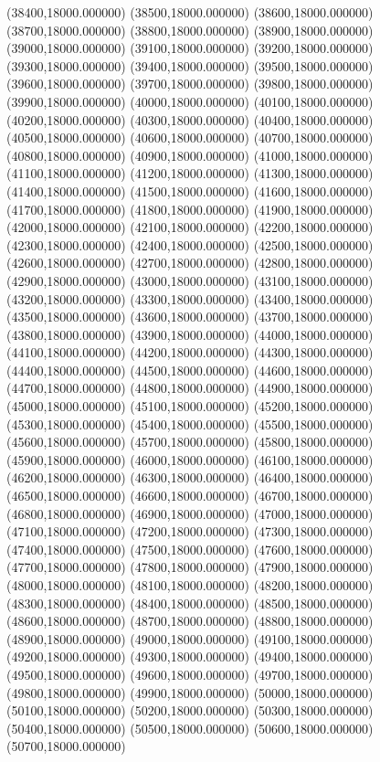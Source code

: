 (38400,18000.000000)
(38500,18000.000000)
(38600,18000.000000)
(38700,18000.000000)
(38800,18000.000000)
(38900,18000.000000)
(39000,18000.000000)
(39100,18000.000000)
(39200,18000.000000)
(39300,18000.000000)
(39400,18000.000000)
(39500,18000.000000)
(39600,18000.000000)
(39700,18000.000000)
(39800,18000.000000)
(39900,18000.000000)
(40000,18000.000000)
(40100,18000.000000)
(40200,18000.000000)
(40300,18000.000000)
(40400,18000.000000)
(40500,18000.000000)
(40600,18000.000000)
(40700,18000.000000)
(40800,18000.000000)
(40900,18000.000000)
(41000,18000.000000)
(41100,18000.000000)
(41200,18000.000000)
(41300,18000.000000)
(41400,18000.000000)
(41500,18000.000000)
(41600,18000.000000)
(41700,18000.000000)
(41800,18000.000000)
(41900,18000.000000)
(42000,18000.000000)
(42100,18000.000000)
(42200,18000.000000)
(42300,18000.000000)
(42400,18000.000000)
(42500,18000.000000)
(42600,18000.000000)
(42700,18000.000000)
(42800,18000.000000)
(42900,18000.000000)
(43000,18000.000000)
(43100,18000.000000)
(43200,18000.000000)
(43300,18000.000000)
(43400,18000.000000)
(43500,18000.000000)
(43600,18000.000000)
(43700,18000.000000)
(43800,18000.000000)
(43900,18000.000000)
(44000,18000.000000)
(44100,18000.000000)
(44200,18000.000000)
(44300,18000.000000)
(44400,18000.000000)
(44500,18000.000000)
(44600,18000.000000)
(44700,18000.000000)
(44800,18000.000000)
(44900,18000.000000)
(45000,18000.000000)
(45100,18000.000000)
(45200,18000.000000)
(45300,18000.000000)
(45400,18000.000000)
(45500,18000.000000)
(45600,18000.000000)
(45700,18000.000000)
(45800,18000.000000)
(45900,18000.000000)
(46000,18000.000000)
(46100,18000.000000)
(46200,18000.000000)
(46300,18000.000000)
(46400,18000.000000)
(46500,18000.000000)
(46600,18000.000000)
(46700,18000.000000)
(46800,18000.000000)
(46900,18000.000000)
(47000,18000.000000)
(47100,18000.000000)
(47200,18000.000000)
(47300,18000.000000)
(47400,18000.000000)
(47500,18000.000000)
(47600,18000.000000)
(47700,18000.000000)
(47800,18000.000000)
(47900,18000.000000)
(48000,18000.000000)
(48100,18000.000000)
(48200,18000.000000)
(48300,18000.000000)
(48400,18000.000000)
(48500,18000.000000)
(48600,18000.000000)
(48700,18000.000000)
(48800,18000.000000)
(48900,18000.000000)
(49000,18000.000000)
(49100,18000.000000)
(49200,18000.000000)
(49300,18000.000000)
(49400,18000.000000)
(49500,18000.000000)
(49600,18000.000000)
(49700,18000.000000)
(49800,18000.000000)
(49900,18000.000000)
(50000,18000.000000)
(50100,18000.000000)
(50200,18000.000000)
(50300,18000.000000)
(50400,18000.000000)
(50500,18000.000000)
(50600,18000.000000)
(50700,18000.000000)
